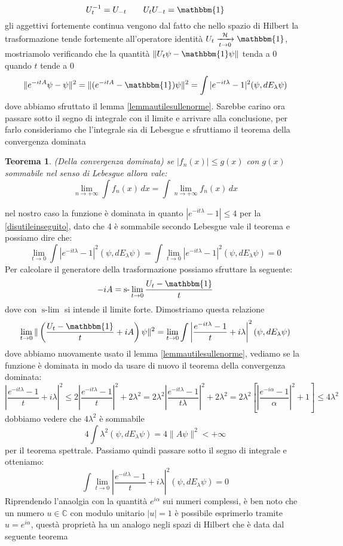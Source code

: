 \documentclass[12pt]{book}
\theoremstyle{plain}
\newcommand{\C}{\mathbb{C}}
\renewcommand{\H}{\mathcal{H}}
\newtheorem{thm}{Teorema}[section]
\theoremstyle{definition}
\theoremstyle{remark}
\begin{document}
\[U_t^{-1} = U_{-t} \qquad U_tU_{-t} = \mathbbm{1}\]
gli aggettivi fortemente continua vengono dal fatto che nello spazio di Hilbert la trasformazione tende fortemente all'operatore identità $U_t \xrightarrow[t\to 0]{\H} \mathbbm{1}$, mostriamolo verificando che la quantità $\|U_t\psi - \mathbbm{1}\psi\|$ tenda a 0 quando $t$ tende a 0
\[\|e^{-itA}\psi -\psi\|^2 = \|(e^{-itA}-\mathbbm{1})\psi\|^2 = \int |e^{-it\lambda}-1|^2(\psi,dE_\lambda\psi) \]
dove abbiamo sfruttato il lemma \eqref{lemmautilesullenorme}. Sarebbe carino ora passare sotto il segno di integrale con il limite e arrivare alla conclusione, per farlo consideriamo che l'integrale sia di Lebesgue e sfruttiamo il teorema della convergenza dominata
\begin{thm}
(Della convergenza dominata)
se $|f_n(x)|\leq g(x)$ con $g(x)$ sommabile nel senso di Lebesgue allora vale:
\[\lim_{n\to+\infty} \int f_n(x)\,dx = \int \lim_{n\to+\infty} f_n(x)\,dx\]
\end{thm}
nel nostro caso la funzione è dominata in quanto $|e^{-it\lambda}-1|\leq 4$ per la \eqref{disutileinseguito}, dato che 4 è sommabile secondo Lebesgue vale il teorema e possiamo dire che:
\[\lim_{t\to0}\int |e^{-it\lambda}-1|^2(\psi,dE_\lambda\psi)  = \int \lim_{t\to 0}|e^{-it\lambda}-1|^2(\psi,dE_\lambda\psi) = 0\]
Per calcolare il generatore della trasformazione possiamo sfruttare la seguente:
\begin{equation}\label{generatore}
-iA = \text{s-}\lim_{t\to 0} \frac{U_t-\mathbbm{1}}{t}
\end{equation}
dove con $\text{s-}\lim$ si intende il limite forte. Dimostriamo questa relazione
\[\lim_{t\to0} \|\left(\frac{U_t-\mathbbm{1}}{t} +iA\right)\psi\|^2 = \lim_{t\to 0}\int\left|\frac{e^{-it\lambda}-1}{t} +i\lambda\right|^2(\psi,dE_\lambda\psi)\]
dove abbiamo nuovamente usato il lemma \eqref{lemmautilesullenorme}, vediamo se la funzione è dominata in modo da usare di nuovo il teorema della convergenza dominata:
\[ \left|\frac{e^{-it\lambda}-1}{t} +i\lambda\right|^2\leq 2\left|\frac{e^{-it\lambda}-1}{t}\right|^2 + 2\lambda^2 = 2\lambda^2\left|\frac{e^{-it\lambda}-1}{t\lambda}\right|^2+ 2\lambda^2  = 2\lambda^2\left[\left|\frac{e^{-i\alpha}-1}{\alpha}\right|^2+1  \right] \leq 4\lambda^2\]
dobbiamo vedere che $4\lambda^2$ è sommabile
\[4\int\lambda^2(\psi,dE_\lambda\psi) = 4\|A\psi\|^2<+\infty\]
per il teorema spettrale. Passiamo quindi passare sotto il segno di integrale e otteniamo:
\[\int\lim_{t\to 0}\left|\frac{e^{-it\lambda}-1}{t} +i\lambda\right|^2(\psi,dE_\lambda\psi) = 0\]
Riprendendo l'anaolgia con la quantità $e^{i\alpha}$ sui numeri complessi, è ben noto che un numero $u\in\C$ con modulo unitario $|u|=1$ è possibile esprimerlo tramite $u = e^{i\alpha}$, questà proprietà ha un analogo negli spazi di Hilbert che è data dal seguente teorema
\end{document}
